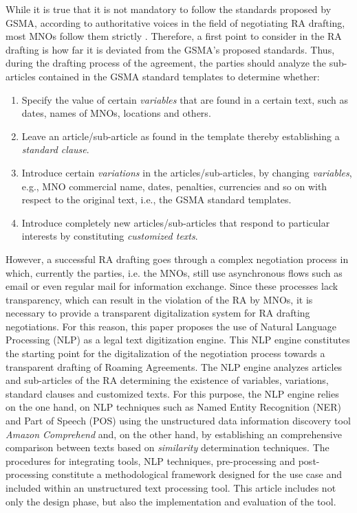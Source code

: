 \documentclass[conference]{style/IEEEtran}
\begin{document}
While it is true that it is not mandatory to follow the standards proposed by GSMA, according to authoritative voices in the field of negotiating RA drafting, most MNOs follow them strictly \cite{ROCCO2017a}. Therefore, a first point to consider in the RA drafting is how far it is deviated from the GSMA's proposed standards. Thus, during the drafting process of the agreement, the parties should analyze the sub-articles contained in the GSMA standard templates to determine whether:

\begin{enumerate}
\item Specify the value of certain \textit{variables} that are found in a certain text, such as dates, names of MNOs, locations and others.

\item Leave an article/sub-article as found in the template thereby establishing a \textit{standard clause}.

\item Introduce certain \textit{variations} in the articles/sub-articles, by changing \textit{variables}, e.g., MNO commercial name, dates, penalties, currencies and so on with respect to the original text, i.e., the GSMA standard templates.

\item Introduce completely new articles/sub-articles that respond to particular interests by constituting \textit{customized texts}.

\end{enumerate}

However, a successful RA drafting goes through a complex negotiation process in which, currently the parties, i.e. the MNOs, still use asynchronous flows such as email or even regular mail for information exchange. Since these processes lack transparency, which can result in the violation of the RA by MNOs, it is necessary to provide a transparent digitalization system for RA drafting negotiations. For this reason, this paper proposes the use of Natural Language Processing (NLP) as a legal text digitization engine. This NLP engine constitutes the starting point for the digitalization of the negotiation process towards a transparent drafting of Roaming Agreements. The NLP engine analyzes articles and sub-articles of the RA determining the existence of variables, variations, standard clauses and customized texts. For this purpose, the NLP engine relies on the one hand, on NLP techniques such as Named Entity Recognition (NER) and Part of Speech (POS) using the unstructured data information discovery tool \textit{Amazon Comprehend} and, on the other hand, by establishing an comprehensive comparison between texts based on \textit{similarity} determination techniques. The procedures for integrating tools, NLP techniques, pre-processing and post-processing constitute a methodological framework designed for the use case and included within an unstructured text processing tool. This article includes not only the design phase, but also the implementation and evaluation of the tool.
\end{document}
